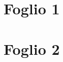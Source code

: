\documentclass{article}
\begin{document}
\tableofcontents

\newpage

\section{Foglio 1}


\section{Foglio 2}

\end{document}
